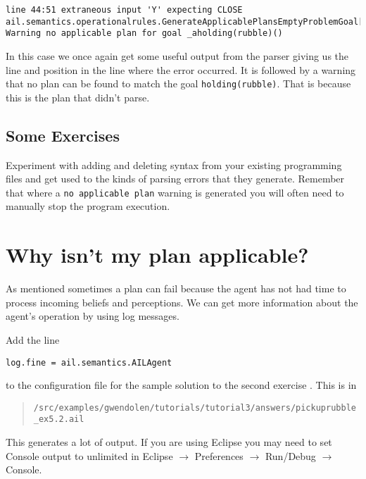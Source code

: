 \begin{verbatim}
line 44:51 extraneous input 'Y' expecting CLOSE
ail.semantics.operationalrules.GenerateApplicablePlansEmptyProblemGoal[WARNING|main|3:19:44]: 
Warning no applicable plan for goal _aholding(rubble)() 
\end{verbatim}

In this case we once again get some useful output from the parser giving us the line and position in the line where the error occurred.  It is followed by a warning that no plan can be found to match the goal \texttt{holding(rubble)}.  That is because this is the plan that didn't parse.

\subsection{Some Exercises}
Experiment with adding and deleting syntax from your existing programming files and get used to the kinds of parsing errors that they generate.  Remember that where a \texttt{no applicable plan} warning is generated you will often need to manually stop the program execution.

\section{Why isn't my plan applicable?}

As mentioned  sometimes a plan can fail because the agent has not had time to process incoming beliefs and perceptions.  We can get more information about the agent's operation by using log messages.

Add the line
\begin{verbatim}
log.fine = ail.semantics.AILAgent
\end{verbatim}
to the configuration file for the sample solution to the second exercise .  This is in
\begin{quote}
\texttt{/src/examples/gwendolen/tutorials/tutorial3/answers/pickuprubble\_ex5.2.ail}
\end{quote}
This generates a lot of output.  If you are using Eclipse you may need to set Console output to unlimited in Eclipse $\rightarrow$ Preferences $\rightarrow$ Run/Debug $\rightarrow$ Console.

